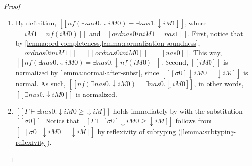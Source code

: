 \begin{proof}
\begin{caseof}
\begin{itemize}
      \begin{enumerate}
        \item By definition, 
          $[[nf(∃nas0.↓iM0) = ∃nas1.↓iM1]]$, 
          where $[[iM1 = nf(iM0)]]$ and $[[ord {nas0} in iM1 = nas1]]$.
          First, notice that by 
          \cref{lemma:ord-completeness,lemma:normalization-soundness}, 
          $[[ord {nas0} in iM1]] = [[ord {nas0} in iM0]] = [[nas0]]$. 
          This way, $[[nf(∃nas0.↓iM0) = ∃nas0.↓nf(iM0)]]$.
          Second, $[[iM0]]$ is normalized by \cref{lemma:normal-after-subst}, 
          since $[[ [σ0] ↓iM0 = ↓iM ]]$ is normal. 
          As such, $[[nf(∃nas0.↓iM0) = ∃nas0.↓iM0]]$, 
          in other words, $[[∃nas0.↓iM0]]$ is normalized.
        \item $[[Γ ⊢ ∃nas0.↓iM0 ≥ ↓iM]]$ holds immediately by 
           with the substitution 
          $[[σ0]]$. Notice that $[[Γ ⊢ [σ0]↓iM0 ≥ ↓iM]]$
          follows from $[[ [σ0] ↓iM0 = ↓iM ]]$
          by reflexivity of subtyping (\cref{lemma:subtyping-reflexivity}).
      \end{enumerate}



    \end{itemize}
  \end{caseof}
\end{proof}


